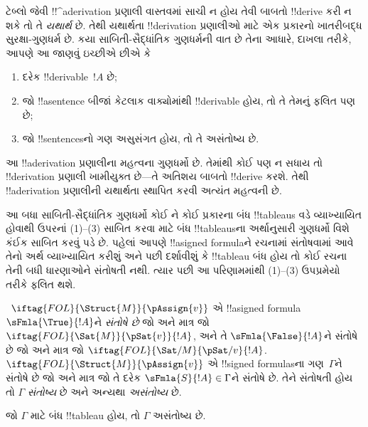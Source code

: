 \documentclass[../../../include/open-logic-section]{subfiles}
\begin{document}
      {}
      {}


\begin{explain}
ટેબ્લો જેવી !!^a{derivation} પ્રણાલી વાસ્તવમાં સાચી ન હોય તેવી બાબતો
!!{derive} કરી ન શકે તો તે \emph{યથાર્થ} છે. તેથી યથાર્થતા
!!{derivation} પ્રણાલીઓ માટે એક પ્રકારનો ખાતરીબદ્ધ સુરક્ષા-ગુણધર્મ છે.
કયા સાબિતી-સૈદ્ધાંતિક ગુણધર્મની વાત છે તેના આધારે, દાખલા તરીકે, આપણે
આ જાણવું ઇચ્છીએ છીએ કે
\begin{enumerate}
\item દરેક !!{derivable}~$!A$  છે;
\item જો !!a{sentence} બીજાં કેટલાક વાક્યોમાંથી !!{derivable} હોય, તો
  તે તેમનું ફલિત પણ છે;
\item જો !!{sentence}sનો ગણ અસુસંગત હોય, તો તે અસંતોષ્ય છે.
\end{enumerate}
આ !!a{derivation} પ્રણાલીના મહત્વના ગુણધર્મો છે. તેમાંથી કોઈ પણ ન સધાય
તો !!{derivation} પ્રણાલી ખામીયુક્ત છે---તે અતિશય બાબતો !!{derive} કરશે.
તેથી !!a{derivation} પ્રણાલીની યથાર્થતા સ્થાપિત કરવી અત્યંત મહત્વની છે.

આ બધા સાબિતી-સૈદ્ધાંતિક ગુણધર્મો કોઈ ને કોઈ પ્રકારના બંધ
!!{tableau}s વડે વ્યાખ્યાયિત હોવાથી ઉપરનાં (1)--(3) સાબિત કરવા માટે
બંધ !!{tableau}sના અર્થાનુસારી ગુણધર્મો વિશે કંઈક સાબિત કરવું પડે છે.
પહેલાં આપણે !!a{signed
  formula}ને રચનામાં સંતોષવામાં આવે તેનો અર્થ
વ્યાખ્યાયિત કરીશું અને પછી દર્શાવીશું કે !!{tableau} બંધ હોય તો કોઈ
રચના તેની બધી ધારણાઓને સંતોષતી નથી. ત્યાર પછી આ પરિણામમાંથી (1)--(3)
ઉપપ્રમેયો તરીકે ફલિત થશે.
\end{explain}

\begin{defn}
~$\iftag{FOL}{\Struct{M}}{\pAssign{v}}$
એ !!a{signed formula} $\sFmla{\True}{!A}$ને \emph{સંતોષે છે} જો અને
માત્ર જો $\iftag{FOL}{\Sat{M}}{\pSat{v}}{!A}$, અને તે
$\sFmla{\False}{!A}$ને સંતોષે છે જો અને માત્ર જો
$\iftag{FOL}{\Sat/{M}}{\pSat/{v}}{!A}$. $\iftag{FOL}{\Struct{M}}{\pAssign{v}}$
એ !!{signed formula}sના ગણ~$\Gamma$ને સંતોષે છે જો અને માત્ર જો તે
દરેક $\sFmla{S}{!A} \in \Gamma$ને સંતોષે છે. તેને સંતોષતી
 હોય તો $\Gamma$
\emph{સંતોષ્ય} છે અને અન્યથા \emph{અસંતોષ્ય} છે.
\end{defn}

\begin{thm}[યથાર્થતા]
  જો $\Gamma$ માટે બંધ !!{tableau} હોય, તો $\Gamma$ અસંતોષ્ય છે.
\end{thm}
\end{document}
